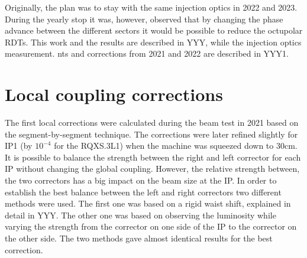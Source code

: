 \documentclass{cernatsnote}
\begin{document}
Originally, the plan was to stay with the same injection optics in 2022 and 2023. During the yearly stop it was, however, observed that by changing the phase advance between the different sectors it would be possible to reduce the octupolar RDTs. This work and the results are described in YYY, while the injection optics measurement. 
nts and corrections from 2021 and 2022 are described in YYY1.

\section{Local coupling corrections}
The first local corrections were calculated during the beam test in 2021 based on the segment-by-segment technique. The corrections were later refined slightly for IP1 (by $10^{-4}$ for the RQXS.3L1) when the machine was squeezed down to 30cm. It is possible to balance the strength between the right and left corrector for each IP without changing the global coupling. However, the relative strength between, the two correctors has a big impact on the beam size at the IP. In order to establish the best balance between the left and right correctors two different methods were used. The first one was based on a rigid waist shift, explained in detail in YYY. The other one was based on observing the luminosity while varying the strength from the corrector on one side of the IP to the corrector on the other side. The two methods gave almost identical results for the best correction. 
\end{document}
